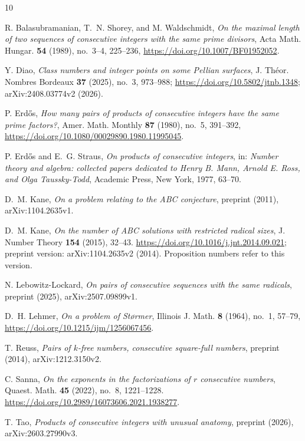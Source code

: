 \documentclass{amsart}
\theoremstyle{remark}
\numberwithin{equation}{section}
\begin{document}
\begin{thebibliography}{10}

R. Balasubramanian, T.~N. Shorey, and M. Waldschmidt,
\emph{On the maximal length of two sequences of consecutive integers with
the same prime divisors}, Acta Math. Hungar. \textbf{54} (1989), no.~3--4,
225--236, \url{https://doi.org/10.1007/BF01952052}.

Y. Diao,
\emph{Class numbers and integer points on some Pellian surfaces},
J. Th\'eor. Nombres Bordeaux \textbf{37} (2025), no.~3, 973--988;
\url{https://doi.org/10.5802/jtnb.1348}; arXiv:2408.03774v2 (2026).

P. Erd\H{o}s,
\emph{How many pairs of products of consecutive integers have the same
prime factors?}, Amer. Math. Monthly \textbf{87} (1980), no.~5, 391--392,
\url{https://doi.org/10.1080/00029890.1980.11995045}.

P. Erd\H{o}s and E.~G. Straus,
\emph{On products of consecutive integers}, in:
\emph{Number theory and algebra: collected papers dedicated to Henry B.
Mann, Arnold E. Ross, and Olga Taussky-Todd}, Academic Press, New York,
1977, 63--70.

D.~M. Kane,
\emph{On a problem relating to the ABC conjecture},
preprint (2011), arXiv:1104.2635v1.

D.~M. Kane,
\emph{On the number of ABC solutions with restricted radical sizes},
J. Number Theory \textbf{154} (2015), 32--43.
\url{https://doi.org/10.1016/j.jnt.2014.09.021}; preprint version:
arXiv:1104.2635v2 (2014). Proposition numbers refer to this version.

N. Lebowitz-Lockard,
\emph{On pairs of consecutive sequences with the same radicals},
preprint (2025), arXiv:2507.09899v1.

D.~H. Lehmer,
\emph{On a problem of St{\o}rmer},
Illinois J. Math. \textbf{8} (1964), no.~1, 57--79,
\url{https://doi.org/10.1215/ijm/1256067456}.

T. Reuss,
\emph{Pairs of $k$-free numbers, consecutive square-full numbers},
preprint (2014), arXiv:1212.3150v2.

C. Sanna,
\emph{On the exponents in the factorizations of $r$ consecutive numbers},
Quaest. Math. \textbf{45} (2022), no.~8, 1221--1228.
\url{https://doi.org/10.2989/16073606.2021.1938277}.

T. Tao,
\emph{Products of consecutive integers with unusual anatomy},
preprint (2026), arXiv:2603.27990v3.

\end{thebibliography}
\end{document}
